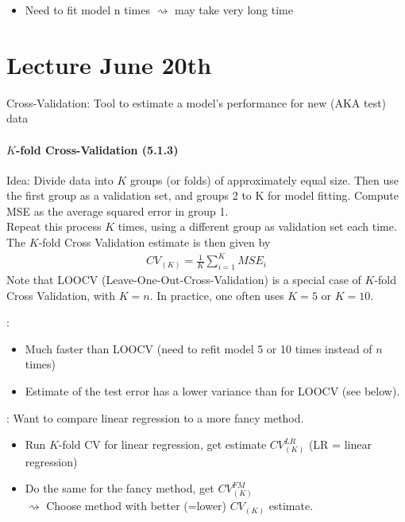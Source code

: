 \documentclass[11pt,a4paper,numbers=endperiod]{scrartcl}
\newcommand{\tit}[1]{\begin{large} \underline{\text{#1}}\end{large}}
\begin{document}
{\tit{Con:} \begin{itemize}
	\item Need to fit model n times $\rightsquigarrow$ may take very long time 
\end{itemize}

\section{Lecture June 20th} 

Cross-Validation: Tool to estimate a model's performance for new (AKA test) data\\

\paragraph{$K$-fold Cross-Validation (5.1.3)}
$ $\\

Idea: Divide data into $K$ groups (or folds) of approximately equal size. 
Then use the first group as a validation set, and groups 2 to K for model fitting. Compute MSE as the average squared error in group 1.\\
Repeat this process $K$ times, using a different group as validation set each time. The $K$-fold Cross Validation estimate is then given by \begin{align*}
	CV_{(K)} = \frac{1}{K} \sum\limits_{i = 1}^K MSE_i
\end{align*}
Note that LOOCV (Leave-One-Out-Cross-Validation) is a special case of $K$-fold Cross Validation, with $K = n$. In practice, one often uses $K = 5$ or $K = 10$.

\tit{Pro}: \begin{itemize}
	\item Much faster than LOOCV (need to refit model 5 or 10 times instead of $n$ times)
	\item Estimate of the test error has a lower variance than for LOOCV (see below).
\end{itemize}

\tit{Example}: Want to compare linear regression to a more fancy method. \begin{itemize}
	\item Run $K$-fold CV for linear regression, get estimate $CV_{(K)}^{LR}$ (LR = linear regression)
	\item Do the same for the fancy method, get $CV_{(K)}^{FM}$\\
	$\rightsquigarrow$ Choose method with better (=lower) $CV_{(K)}$ estimate. 
\end{itemize}
\newpage
}
\end{document}
